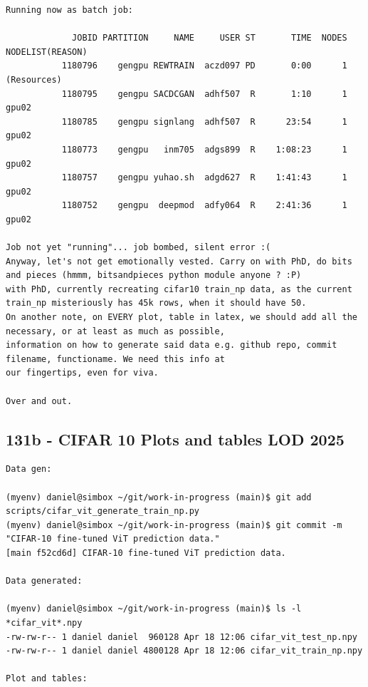 \begin{verbatim}
Running now as batch job:

             JOBID PARTITION     NAME     USER ST       TIME  NODES NODELIST(REASON)
           1180796    gengpu REWTRAIN  aczd097 PD       0:00      1 (Resources)
           1180795    gengpu SACDCGAN  adhf507  R       1:10      1 gpu02
           1180785    gengpu signlang  adhf507  R      23:54      1 gpu02
           1180773    gengpu   inm705  adgs899  R    1:08:23      1 gpu02
           1180757    gengpu yuhao.sh  adgd627  R    1:41:43      1 gpu02
           1180752    gengpu  deepmod  adfy064  R    2:41:36      1 gpu02

Job not yet "running"... job bombed, silent error :(
Anyway, let's not get emotionally vested. Carry on with PhD, do bits and pieces (hmmm, bitsandpieces python module anyone ? :P)
with PhD, currently recreating cifar10 train_np data, as the current train_np misteriously has 45k rows, when it should have 50.
On another note, on EVERY plot, table in latex, we should add all the necessary, or at least as much as possible,
information on how to generate said data e.g. github repo, commit filename, functioname. We need this info at 
our fingertips, even for viva.

Over and out.

\end{verbatim}

\subsection{131b - CIFAR 10 Plots and tables LOD 2025}
\label{app_res:131b}

\begin{verbatim}
Data gen: 

(myenv) daniel@simbox ~/git/work-in-progress (main)$ git add scripts/cifar_vit_generate_train_np.py 
(myenv) daniel@simbox ~/git/work-in-progress (main)$ git commit -m "CIFAR-10 fine-tuned ViT prediction data."
[main f52cd6d] CIFAR-10 fine-tuned ViT prediction data.

Data generated:

(myenv) daniel@simbox ~/git/work-in-progress (main)$ ls -l *cifar_vit*.npy
-rw-rw-r-- 1 daniel daniel  960128 Apr 18 12:06 cifar_vit_test_np.npy
-rw-rw-r-- 1 daniel daniel 4800128 Apr 18 12:06 cifar_vit_train_np.npy

Plot and tables:

\end{verbatim}

